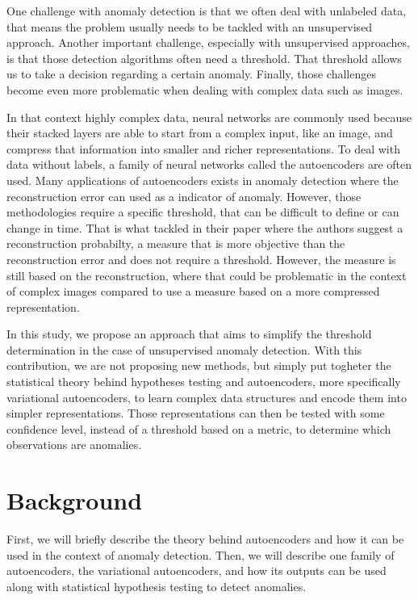 \documentclass{article}
\begin{document}
One challenge with anomaly detection is that we often deal with unlabeled data, that means the problem usually needs to be tackled with an unsupervised approach. Another important challenge, especially with unsupervised approaches, is that those detection algorithms often need a threshold. That threshold allows us to take a decision regarding a certain anomaly. Finally, those challenges become even more problematic when dealing with complex data such as images. \newline

In that context highly complex data, neural networks are commonly used because their stacked layers are able to start from a complex input, like an image, and compress that information into smaller and richer representations. To deal with data without labels, a family of neural networks called the autoencoders are often used. Many applications of autoencoders exists in anomaly detection where the reconstruction error can used as a indicator of anomaly. However, those methodologies require a specific threshold, that can be difficult to define or can change in time. That is what \cite{An2015VariationalAB} tackled in their paper where the authors suggest a reconstruction probabilty, a measure that is more objective than the reconstruction error and does not require a threshold. However, the measure is still based on the reconstruction, where that could be problematic in the context of complex images compared to use a measure based on a more compressed representation.
\newline


In this study, we propose an approach that aims to simplify the threshold determination in the case of unsupervised anomaly detection. With this contribution, we are not proposing new methods, but simply put togheter the statistical theory behind hypotheses testing and autoencoders, more specifically variational autoencoders, to learn complex data structures and encode them into simpler representations. Those representations can then be tested with some confidence level, instead of a threshold based on a metric, to determine which observations are anomalies.

\section{Background} \label{background}

First, we will briefly describe the theory behind autoencoders and how it can be used in the context of anomaly detection. Then, we will describe one family of autoencoders, the variational autoencoders, and how its outputs can be used along with statistical hypothesis testing to detect anomalies.
\end{document}
